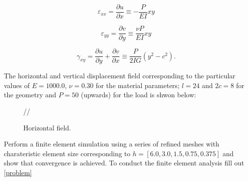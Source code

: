 \[{\varepsilon _{xx}} = \frac{{\partial u}}{{\partial x}} \equiv  - \frac{P}{{EI}}xy\]

\[{\varepsilon _{yy}} = \frac{{\partial v}}{{\partial y}} \equiv \frac{{\nu P}}{{EI}}xy\]

\[{\gamma _{xy}} = \frac{{\partial u}}{{\partial y}} + \frac{{\partial v}}{{\partial x}} \equiv \frac{P}{{2IG}}\left( {{y^2} - {c^2}} \right).\]

The horizontal and vertical displacement field corresponding to the particular values of $E=1000.0$, $\nu=0.30$ for the material parameters; $l=24$ and $2c=8$ for the geometry and $P=50$ (upwards) for the load is shwon below:

\begin{figure}[H]
\centering
{}//
\caption{Horizontal field.}
\label{fig:ecuacion}
\end{figure}


Perform a finite element simulation using a series of refined meshes with charateristic element size corresponding to $h=[6.0,3.0,1.5,0.75,0.375]$ and show that convergence is achieved. To conduct the finite element analysis fill out \cref{problem}


